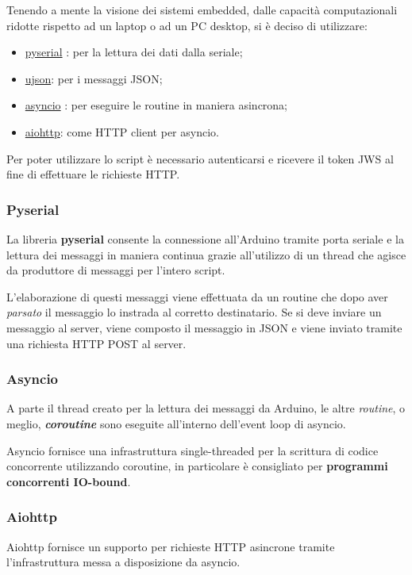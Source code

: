 Tenendo a mente la visione dei sistemi embedded, dalle capacità computazionali ridotte rispetto ad un laptop o ad un PC desktop, si è deciso di utilizzare:
\begin{itemize}
	\item \href{https://github.com/pyserial/pyserial}{pyserial} : per la lettura dei dati dalla seriale;
	\item \href{https://github.com/pyserial/pyserial}{ujson}: per i messaggi JSON;
	\item \href{https://github.com/python/asyncio}{asyncio} : per eseguire le routine in maniera asincrona;
	\item \href{https://github.com/KeepSafe/aiohttp}{aiohttp}: come HTTP client per asyncio.
\end{itemize}
Per poter utilizzare lo script è necessario autenticarsi e ricevere il token JWS al fine di effettuare le richieste HTTP.

\subsubsection{Pyserial}
La libreria \textbf{pyserial} consente la connessione all'Arduino tramite porta seriale e la lettura dei messaggi in maniera continua grazie all'utilizzo di un thread che agisce da produttore di messaggi per l'intero script.

L'elaborazione di questi messaggi viene effettuata da un routine che dopo aver \textit{parsato} il messaggio lo instrada al corretto destinatario. Se si deve inviare un messaggio al server, viene composto il messaggio in JSON e viene inviato tramite una richiesta HTTP POST al server.

\subsubsection{Asyncio}
A parte il thread creato per la lettura dei messaggi da Arduino, le altre \textit{routine}, o meglio, \textit{\textbf{coroutine}} sono eseguite all'interno dell'event loop di asyncio. 

Asyncio fornisce una infrastruttura single-threaded per la scrittura di codice concorrente utilizzando coroutine, in particolare è consigliato per \textbf{programmi concorrenti IO-bound}. 

\subsubsection{Aiohttp}
Aiohttp fornisce un supporto per richieste HTTP asincrone tramite l'infrastruttura messa a disposizione da asyncio.

